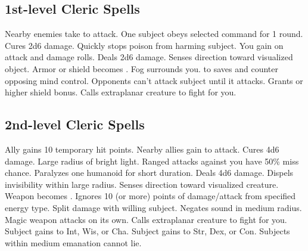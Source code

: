 \subsection{1st-level Cleric Spells}
\begin{spelllist}
   Nearby enemies take  to attack.
   One subject obeys selected command for 1 round.
   Cures 2d6 damage.
   Quickly stops poison from harming subject.
   You gain  on attack and damage rolls.
   Deals 2d6 damage.
   Senses direction toward visualized object.
   Armor or shield becomes .
   Fog surrounds you.
    to saves and counter opposing mind control.
   Opponents can't attack subject until it attacks.
   Grants  or higher shield bonus.
   Calls extraplanar creature to fight for you.
\end{spelllist}

\subsection{2nd-level Cleric Spells}
\begin{spelllist}
   Ally gains 10 temporary hit points.
   Nearby allies gain  to attack.
   Cures 4d6 damage.
   Large radius of bright light.
   Ranged attacks against you have 50\% miss chance.
   Paralyzes one humanoid for short duration.
   Deals 4d6 damage.
   Dispels invisibility within large radius.
   Senses direction toward visualized creature.
   Weapon becomes .
   Ignores 10 (or more) points of damage/attack from specified energy type.
    Split damage with willing subject.
   Negates sound in medium radius.
   Magic weapon attacks on its own.
   Calls extraplanar creature to fight for you.
   Subject gains  to Int, Wis, or Cha.
   Subject gains  to Str, Dex, or Con.
   Subjects within medium emanation cannot lie.
\end{spelllist}

